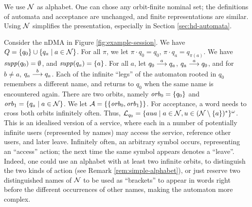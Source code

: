 \begin{remark}\label{rem:simple-alphabet} We use $\mathcal{N}$ as alphabet. One can chose any orbit-finite nominal set; the definitions of automata and acceptance are unchanged, and finite representations are similar.
%
Using $\mathcal{N}$ simplifies the presentation, especially in Section \ref{sec:hd-automata}.
\end{remark}

\begin{example}\label{exa:session}
 Consider the nDMA in Figure \ref{fig:example-session}. We have $Q = \{q_0\} \cup \{q_a \mid a \in \mathcal{N}\}$. For all $\pi$, we let $\pi \cdot q_0 = q_0$, $\pi \cdot q_a = q_{\pi(a)}$. We have $\mathit{supp}(q_0) = \emptyset$, and $\mathit{supp}(q_a) = \{ a \}$. For all $a$, let $q_0 \overset{a}{\longrightarrow} q_a$, $q_a \overset{a}{\longrightarrow} q_0$, and for $b \neq a$, $q_a \overset{b}{\longrightarrow} q_a$. Each of the infinite ``legs'' of the automaton rooted in $q_0$ remembers a different name, and returns to $q_0$ when the same name is encountered again. There are two orbits, namely $\mathit{orb}_0 = \{ q_0 \}$ and $\mathit{orb}_1 = \{ q_a \mid a \in \mathcal{N} \}$. We let $\mathcal{A} = \{ \{ \mathit{orb}_0, \mathit{orb}_1 \} \}$. For acceptance, a word needs to cross both orbits infinitely often. Thus, $\mathcal{L}_{q_0}=\{aua \mid a \in \mathcal{N}, u \in (\mathcal{N}\setminus\{a\})^* \}^\omega$. 
% 
 This is an idealised version of a service, where each in a number of potentially infinite users (represented by names) may access the service, reference other users, and later leave. Infinitely often, an arbitrary symbol occurs, representing an ``access'' action; the next time the same symbol appears denotes a ``leave''. Indeed, one could use an  alphabet with at least two infinite orbits, to distinguish the two kinds of action (see Remark \ref{rem:simple-alphabet}), or just reserve two distinguished names of $\mathcal{N}$ to be used as ``brackets'' 	to appear in words right before the different occurrences of other names, making the automaton more complex.
\end{example}

